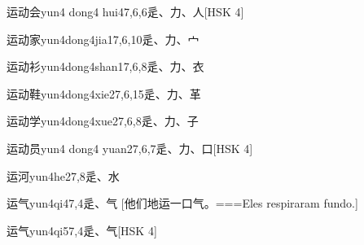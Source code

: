\begin{EntryWithPhonetic}{运动会}{yun4 dong4 hui4}{7,6,6}{⾡、⼒、⼈}[HSK 4]
\end{EntryWithPhonetic}

\begin{EntryWithPhonetic}{运动家}{yun4dong4jia1}{7,6,10}{⾡、⼒、⼧}
\end{EntryWithPhonetic}

\begin{EntryWithPhonetic}{运动衫}{yun4dong4shan1}{7,6,8}{⾡、⼒、⾐}
\end{EntryWithPhonetic}

\begin{EntryWithPhonetic}{运动鞋}{yun4dong4xie2}{7,6,15}{⾡、⼒、⾰}
\end{EntryWithPhonetic}

\begin{EntryWithPhonetic}{运动学}{yun4dong4xue2}{7,6,8}{⾡、⼒、⼦}
\end{EntryWithPhonetic}

\begin{EntryWithPhonetic}{运动员}{yun4 dong4 yuan2}{7,6,7}{⾡、⼒、⼝}[HSK 4]
\end{EntryWithPhonetic}

\begin{EntryWithPhonetic}{运河}{yun4he2}{7,8}{⾡、⽔}
\end{EntryWithPhonetic}

\begin{EntryWithPhonetic}{运气}{yun4qi4}{7,4}{⾡、⽓}
  [他们地运一口气。===Eles respiraram fundo.]
\end{EntryWithPhonetic}

\begin{EntryWithPhonetic}{运气}{yun4qi5}{7,4}{⾡、⽓}[HSK 4]
\end{EntryWithPhonetic}

